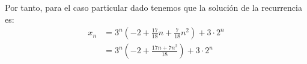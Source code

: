 \documentclass[12pt]{article}
\begin{document}
\begin{ejercicio}[Recurrencia]
        Por tanto, para el caso particular dado tenemos que la solución de la recurrencia es:
        \begin{align*}
            x_n &= 3^n\left(-2 + \frac{17}{18}n + \frac{7}{18}n^2\right) + 3\cdot 2^n \\
            &= 3^n\left(-2 + \frac{17n + 7n^2}{18}\right) + 3\cdot 2^n
        \end{align*}
        
    
    
    \end{ejercicio}


    
\end{document}

